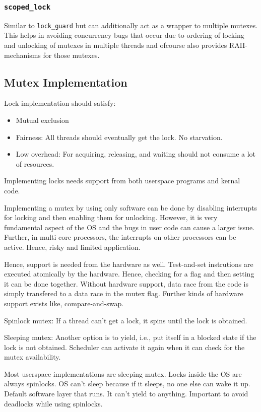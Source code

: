 \documentclass{scrartcl}
\begin{document}
\subsubsection{\texttt{scoped_lock}}
Similar to \texttt{lock_guard} but can additionally act as a wrapper to multiple mutexes. This helps in avoiding concurrency bugs that occur due to ordering of locking and unlocking of mutexes in multiple threads and ofcourse also provides RAII-mechanisms for those mutexes.

\subsection{Mutex Implementation}
Lock implementation should satisfy:
\begin{itemize}
\item Mutual exclusion
\item Fairness: All threads should eventually get the lock. No starvation.
\item Low overhead: For acquiring, releasing, and waiting should not consume a lot of resources.
\end{itemize}

Implementing locks needs support from both userspace programs and kernal code.

Implementing a mutex by using only software can be done by disabling interrupts for locking and then enabling them for unlocking. However, it is very fundamental aspect of the OS and the bugs in user code can cause a larger issue. Further, in multi core processors, the interrupts on other processors can be active. Hence, risky and limited application. 

Hence, support is needed from the hardware as well. Test-and-set instrutions are executed atomically by the hardware. Hence, checking for a flag and then setting it can be done together. Without hardware support, data race from the code is simply transfered to a data race in the mutex flag. Further kinds of hardware support exists like, compare-and-swap.

Spinlock mutex: If a thread can't get a lock, it spins until the lock is obtained. 

Sleeping mutex: Another option is to yield, i.e., put itself in a blocked state if the lock is not obtained. Scheduler can activate it again when it can check for the mutex availability.

Most userspace implementations are sleeping mutex. Locks inside the OS are always spinlocks. OS can't sleep because if it sleeps, no one else can wake it up. Default software layer that runs. It can't yield to anything. Important to avoid deadlocks while using spinlocks. 
\end{document}
